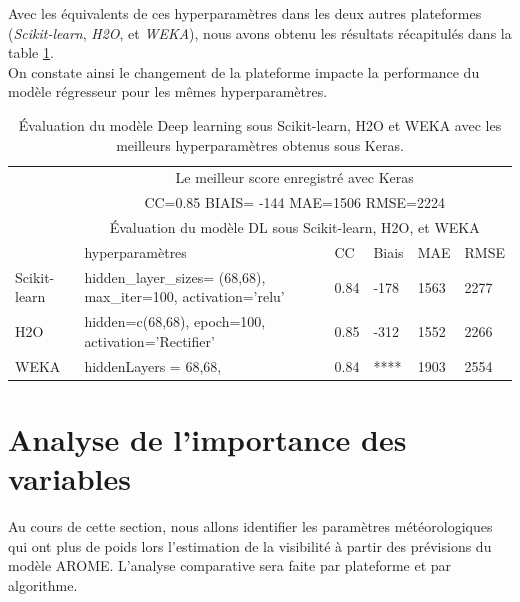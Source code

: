 Avec les équivalents de ces hyperparamètres dans les deux autres plateformes (\textit{Scikit-learn}, \textit{H2O}, et \textit{WEKA}), nous avons obtenu les résultats récapitulés dans la table \ref{tab:dl_croisé}.\\ 

 On constate ainsi le changement de la plateforme impacte la performance du modèle régresseur pour les mêmes hyperparamètres.\\
\begin{table}[ht]
    \centering
    \begin{tabular}{ |p{1.6cm}|p{4cm}|p{1.6cm}|p{1.6cm}|p{1.6cm}|p{1.6cm}|  }
     \hline
     & \multicolumn{5}{c|}{Le meilleur score enregistré avec Keras} \\
     &\multicolumn{5}{c|}{CC=0.85 \hspace{0.2cm} BIAIS= -144 \hspace{0.2cm} MAE=1506 \hspace{0.2cm} RMSE=2224}\\
     \hline
     & \multicolumn{5}{|c|}{Évaluation du modèle DL sous Scikit-learn, H2O, et WEKA} \\
     \hline
     & hyperparamètres & CC & Biais & MAE & RMSE\\
     \hline
     Scikit-learn & hidden\_layer\_sizes= (68,68), max\_iter=100, activation='relu' & 0.84  & -178 & 1563 & 2277 \\
     \hline
     H2O & hidden=c(68,68), epoch=100, activation='Rectifier' & 0.85 & -312 & 1552 & 2266 \\
     \hline
     WEKA & hiddenLayers = 68,68,  & 0.84 & **** & 1903 & 2554 \\
     \hline
    \end{tabular}
    \caption{Évaluation du modèle Deep learning sous Scikit-learn, H2O et WEKA  avec les meilleurs hyperparamètres obtenus sous Keras. }
    \label{tab:dl_croisé}
\end{table}
\section{Analyse de l'importance des variables}
Au cours de cette section, nous allons identifier les paramètres météorologiques qui ont plus de poids lors l'estimation de la visibilité à partir des prévisions du modèle AROME. L'analyse comparative sera faite par plateforme et par algorithme.\\

